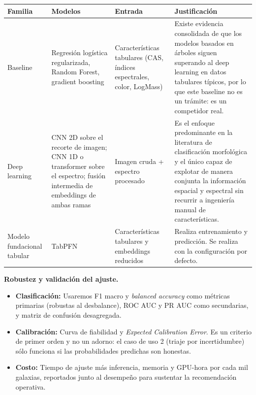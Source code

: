 \begin{table}[H]
\centering
\scriptsize

\begin{tabular}{
|p{}
|p{}
|p{}
|p{}|}

\hline

\textbf{Familia} &
\textbf{Modelos} &
\textbf{Entrada} &
\textbf{Justificación}
\\ \hline

Baseline &
Regresión logística regularizada, Random Forest, gradient boosting &
Características tabulares (CAS, índices espectrales, color, LogMass) &
Existe evidencia consolidada de que los modelos basados en árboles siguen superando al deep learning en datos tabulares típicos, por lo que este baseline no es un trámite: es un competidor real.
\\ \hline

Deep learning &
CNN 2D sobre el recorte de imagen; CNN 1D o transformer sobre el espectro; fusión intermedia de embeddings de ambas ramas &
Imagen cruda + espectro procesado &
Es el enfoque predominante en la literatura de clasificación morfológica y el único capaz de explotar de manera conjunta la información espacial y espectral sin recurrir a ingeniería manual de características.
\\ \hline

Modelo fundacional tabular &
TabPFN &
Características tabulares y embeddings reducidos &
Realiza entrenamiento y predicción. Se realiza con la configuración por defecto.
\\ \hline

\end{tabular}

\end{table}


\textbf{Robustez y validación del ajuste.}

\begin{itemize}
    \item \textbf{Clasificación:}
    Usaremos F1 macro y \textit{balanced accuracy} como métricas primarias (robustas al desbalance), ROC AUC y PR AUC como secundarias, y matriz de confusión desagregada.
    \item \textbf{Calibración:}
    Curva de fiabilidad y \textit{Expected Calibration Error}. Es un criterio de primer orden y no un adorno: el caso de uso 2 (triaje por incertidumbre) sólo funciona si las probabilidades predichas son honestas.
    \item \textbf{Costo:}
    Tiempo de ajuste más inferencia, memoria y GPU-hora por cada mil galaxias, reportados junto al desempeño para sustentar la recomendación operativa.
\end{itemize}


